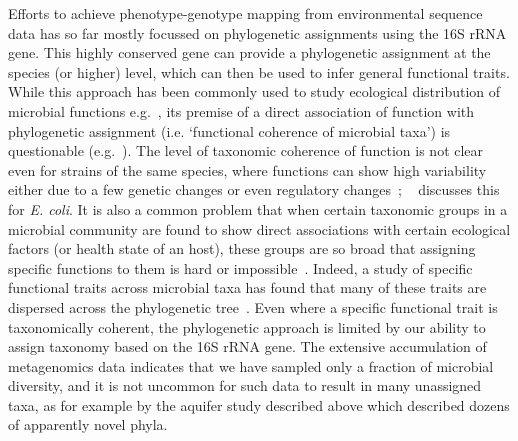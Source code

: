 \documentclass[10pt,letterpaper]{article}
\begin{document}
Efforts to achieve phenotype-genotype mapping from environmental sequence data has so far mostly focussed on phylogenetic assignments using the 16S rRNA gene. This highly conserved
gene can provide a phylogenetic assignment at the species (or higher) level, which can then be used to infer general functional traits. While this approach has been commonly used to study ecological distribution of microbial functions e.g.~\cite{Philippot2009,Louca2016a,Louca2016b}, its premise of a direct association of function with phylogenetic assignment (i.e.
‘functional coherence of microbial taxa’) is questionable (e.g.~\cite{Philippot2010}).
The level of taxonomic coherence of function is not clear even for strains of the same species,
where functions can show high variability either due to a few genetic changes or even
regulatory changes~\cite{Martiny2015}; ~\cite{Sabarly2011} discusses this for \emph{E. coli}. It
is also a common problem that when certain taxonomic groups in a microbial community are
found to show direct associations with certain ecological factors (or health state of an host),
these groups are so broad that assigning specific functions to them is hard or impossible~\cite{Koeppel2012}. Indeed, a study of specific functional traits
across microbial taxa has found that many of these traits are dispersed across the
phylogenetic tree~\cite{Martiny2015,Martiny2013}. Even where a specific functional trait is taxonomically coherent, the
phylogenetic approach is limited by our ability to assign taxonomy based on the 16S rRNA gene. The extensive accumulation of metagenomics data indicates that we have sampled only a fraction of microbial diversity, and it is not uncommon for such data to result in many
unassigned taxa, as for example by the aquifer study described above which described dozens of apparently novel phyla.
\end{document}
